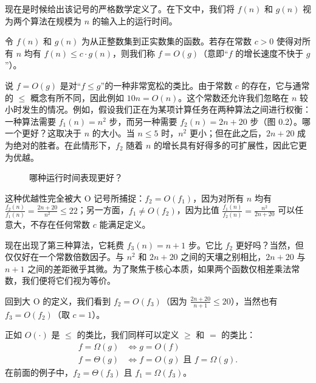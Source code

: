 现在是时候给出该记号的严格数学定义了。在下文中，我们将 $f(n)$ 和 $g(n)$ 视为两个算法在规模为 $n$ 的输入上的运行时间。

\begin{tcolorbox}[colback=white,colframe=gray!50!black]
令 $f(n)$ 和 $g(n)$ 为从正整数集到正实数集的函数。若存在常数 $c > 0$ 使得对所有 $n$ 均有 $f(n) \le c \cdot g(n)$，则我们称 $f = O(g)$（意即“$f$ 的增长速度不快于 $g$”）。
\end{tcolorbox}

说 $f = O(g)$ 是对“$f \le g$”的一种非常宽松的类比。由于常数 $c$ 的存在，它与通常的 $\le$ 概念有所不同，因此例如 $10n = O(n)$。这个常数还允许我们忽略在 $n$ 较小时发生的情况。例如，假设我们正在为某项计算任务在两种算法之间进行权衡：一种算法需要 $f_1(n) = n^2$ 步，而另一种需要 $f_2(n) = 2n + 20$ 步（图 0.2）。哪一个更好？这取决于 $n$ 的大小。当 $n \le 5$ 时，$n^2$ 更小；但在此之后，$2n + 20$ 成为绝对的胜者。在此情形下，$f_2$ 随着 $n$ 的增长具有好得多的可扩展性，因此它更为优越。

\begin{figure}[htbp]
\centering
{}
\caption{哪种运行时间表现更好？}
\label{fig:big_o_comparison}
\end{figure}

这种优越性完全被大 O 记号所捕捉：$f_2 = O(f_1)$，因为对所有 $n$ 均有 $\frac{f_2(n)}{f_1(n)} = \frac{2n + 20}{n^2} \le 22$；另一方面，$f_1 \ne O(f_2)$，因为比值 $\frac{f_1(n)}{f_2(n)} = \frac{n^2}{2n + 20}$ 可以任意大，不存在任何常数 $c$ 能满足定义。

现在出现了第三种算法，它耗费 $f_3(n) = n + 1$ 步。它比 $f_2$ 更好吗？当然，但仅仅好在一个常数倍数因子。与 $n^2$ 和 $2n + 20$ 之间的天壤之别相比，$2n + 20$ 与 $n + 1$ 之间的差距微乎其微。为了聚焦于核心本质，如果两个函数仅相差乘法常数，我们便将它们视为等价。

回到大 O 的定义，我们看到 $f_2 = O(f_3)$（因为 $\frac{2n+20}{n+1} \le 20$），当然也有 $f_3 = O(f_2)$（取 $c = 1$）。

正如 $O(\cdot)$ 是 $\le$ 的类比，我们同样可以定义 $\ge$ 和 $=$ 的类比：
\begin{align*}
f = \Omega(g) &\iff g = O(f) \\
f = \Theta(g) &\iff f = O(g) \text{ 且 } f = \Omega(g).
\end{align*}
在前面的例子中，$f_2 = \Theta(f_3)$ 且 $f_1 = \Omega(f_3)$。

